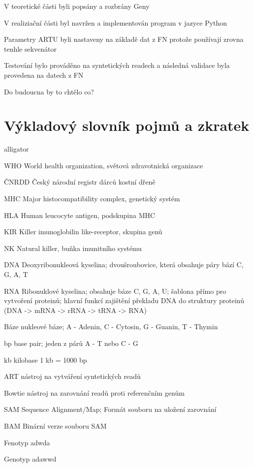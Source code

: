 \documentclass[czech,DP]{thesiskiv}
\numberwithin{equation}{section}
\begin{document}
V teoretické části byli popsány a rozbrány Geny 

V realiziační části byl navržen a implementován program v jazyce Python 

Parametry ARTU byli nastaveny na základě dat z FN protože používají zrovna tenhle sekvenátor

Testování bylo prováděno na syntetických readech a následná validace byla provedena na datech z FN

Do budoucna by to chtělo co?

\chapter{Výkladový slovník pojmů a zkratek}

\begin{labeling}{alligator}
	\item [WHO] World health organization, světová zdravotnická organizace
	\item [ČNRDD] Český národní registr dárců kostní dřeně
	\item [MHC] Major histocompatibility complex, genetický systém	
	\item [HLA] Human leucocyte antigen, podskupina MHC
	\item [KIR] Killer imunoglobilin like-receptor, skupina genů
	\item [NK] Natural killer, buňka imunitního systému
	\item [DNA] Deoxyribonukleová kyselina; dvoušroubovice, která obsahuje páry bází C, G, A, T 
	\item [RNA] Ribonuklové kyselina; obsahuje báze C, G, A, U; šablona přímo pro vytvoření proteinů; hlavní funkcí zajištění překladu DNA do struktury proteinů (DNA -> mRNA -> rRNA -> tRNA -> RNA) 
	\item [Báze] nukleové báze; A - Adenin, C - Cytosin, G - Guanin, T - Thymin
	\item [bp] base pair; jeden z párů A - T nebo C - G
	\item [kb] kilobase 1 kb = 1000 bp
	\item [ART] nástroj na vytváření syntetických readů
	\item [Bowtie] nástroj na zarovnání readů proti referenčním genům
	\item [SAM] Sequence Alignment/Map; Formát souboru na uložení zarovnání
	\item [BAM] Binární verze souboru SAM
	\item [Fenotyp] adwda
	\item [Genotyp] adawwd
\end{labeling}
\end{document}
